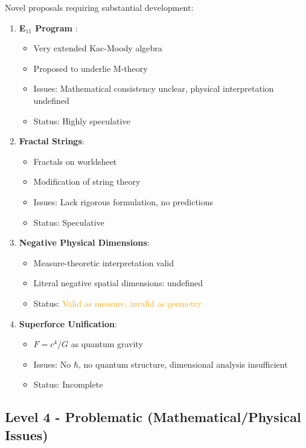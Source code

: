 Novel proposals requiring substantial development:

\begin{enumerate}
    \item \textbf{E$_{11}$ Program} \cite{west2001e11}:
    \begin{itemize}
        \item Very extended Kac-Moody algebra
        \item Proposed to underlie M-theory
        \item Issues: Mathematical consistency unclear, physical interpretation undefined
        \item Status: \textcolor{claimcolor}{Highly speculative}
    \end{itemize}

    \item \textbf{Fractal Strings}:
    \begin{itemize}
        \item Fractals on worldsheet
        \item Modification of string theory
        \item Issues: Lack rigorous formulation, no predictions
        \item Status: \textcolor{claimcolor}{Speculative}
    \end{itemize}

    \item \textbf{Negative Physical Dimensions}:
    \begin{itemize}
        \item Measure-theoretic interpretation valid
        \item Literal negative spatial dimensions: undefined
        \item Status: \textcolor{orange}{Valid as measure, invalid as geometry}
    \end{itemize}

    \item \textbf{Superforce Unification}:
    \begin{itemize}
        \item $F = c^4/G$ as quantum gravity
        \item Issues: No $\hbar$, no quantum structure, dimensional analysis insufficient
        \item Status: \textcolor{claimcolor}{Incomplete}
    \end{itemize}
\end{enumerate}

\subsection{Level 4 - Problematic (Mathematical/Physical Issues)}

